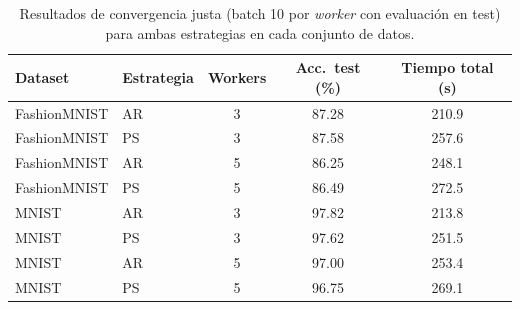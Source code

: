 \begin{table}[H]\centering
\caption{Resultados de convergencia justa (batch 10 por \emph{worker} con evaluaci\'on en test) para ambas estrategias en cada conjunto de datos.}\label{tab:main}
\footnotesize
\setlength{\tabcolsep}{3.5pt}
\begin{tabular}{llcS[table-format=2.2,round-precision=2]S[table-format=3.1,round-precision=1]}\toprule
Dataset & Estrategia & Workers & {Acc.\ test (\%)} & {Tiempo total (s)}\\\midrule
FashionMNIST & AR & 3 & 87.28 & 210.9\\
FashionMNIST & PS & 3 & 87.58 & 257.6\\
FashionMNIST & AR & 5 & 86.25 & 248.1\\
FashionMNIST & PS & 5 & 86.49 & 272.5\\
\midrule
MNIST & AR & 3 & 97.82 & 213.8\\
MNIST & PS & 3 & 97.62 & 251.5\\
MNIST & AR & 5 & 97.00 & 253.4\\
MNIST & PS & 5 & 96.75 & 269.1\\
\bottomrule\end{tabular}
\end{table}
